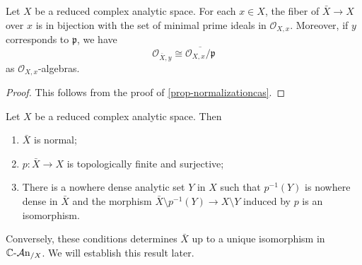 \begin{proposition}\label{prop-normalizationbranches}
    Let $X$ be a reduced complex analytic space. For each $x\in X$, the fiber of $\bar{X}\rightarrow X$ over $x$ is in bijection with the set of minimal prime ideals in $\mathcal{O}_{X,x}$. Moreover, if $y$ corresponds to $\mathfrak{p}$, we have
    \[
      \mathcal{O}_{\bar{X},y}\cong  \overline{\mathcal{O}_{X,x}/\mathfrak{p}}
    \] 
    as $\mathcal{O}_{X,x}$-algebras.
\end{proposition}
\begin{proof}
    This follows from the proof of \cref{prop-normalizationcas}.   
\end{proof}



\begin{proposition}\label{prop-reducedspacenormalizationchar}
    Let $X$ be a reduced complex analytic space. Then 
    \begin{enumerate}
        \item $\bar{X}$ is normal;
        \item $p:\bar{X}\rightarrow X$ is topologically finite and surjective;
        \item There is a nowhere dense analytic set $Y$ in $X$ such that $p^{-1}(Y)$ is nowhere dense in $\bar{X}$ and the morphism $\bar{X}\setminus p^{-1}(Y)\rightarrow X\setminus Y$ induced by $p$ is an isomorphism.
    \end{enumerate}
\end{proposition}

Conversely, these conditions determines $\bar{X}$ up to a unique isomorphism in $\mathbb{C}\text{-}\mathcal{A}\mathrm{n}_{/X}$. We will establish this result later.

